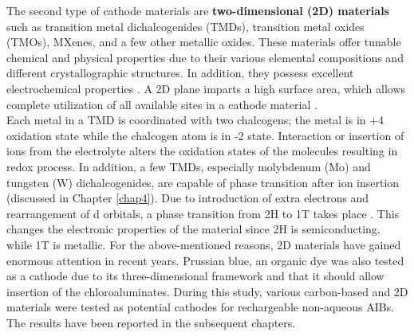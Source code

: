 The second type of cathode materials are \textbf{two-dimensional (2D) materials} such as transition metal dichalcogenides (TMDs), transition metal oxides (TMOs), MXenes, and a few other metallic oxides. These materials offer tunable chemical and physical properties due to their various elemental compositions and different crystallographic structures. In addition, they possess excellent electrochemical properties \cite{chia_electrochemistry_2015}. A 2D plane imparts a high surface area, which allows complete utilization of all available sites in a cathode material \cite{jia_interfacial_2016,naguib_mxene_2012}.\\ Each metal in a TMD is coordinated with two chalcogens; the metal is in +4 oxidation state while the chalcogen atom is in -2 state. Interaction or insertion of ions from the electrolyte alters the oxidation states of the molecules resulting in redox process. In addition, a few TMDs, especially molybdenum (Mo) and tungsten (W) dichalcogenides, are capable of phase transition after ion insertion (discussed in Chapter \ref{chap4}). Due to introduction of extra electrons and rearrangement of d orbitals, a phase transition from 2H to 1T takes place \cite{acerce_metallic_2015-1}. This changes the electronic properties of the material since 2H  is semiconducting, while 1T  is metallic. For the above-mentioned reasons, 2D materials have gained enormous attention in recent years. Prussian blue, an organic dye was also tested as a cathode due to its three-dimensional framework and that it should allow insertion of the chloroaluminates. 
During this study, various carbon-based and 2D materials were tested as potential cathodes for rechargeable non-aqueous AIBs. The results have been reported in the subsequent chapters.

